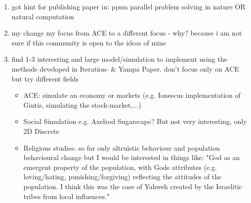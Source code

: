 \begin{enumerate}
\item got hint for publishing paper in: ppsm parallel problem solving in nature OR natural computation
	
\item my change my focus from ACE to a different focus - why? because i am not sure if this community is open to the ideas of mine
\item find 1-3 interesting and large model/simulation to implement using the methods developed in Iteration- \& Yampa Paper. don't focus only on ACE but try different fields
	\begin{itemize}
		\item ACE: simulate an economy or markets (e.g. Ionescus implementation of Gintis, simulating the stock-market,...)
		\item Social Simulation e.g. Axelrod Sugarscape? But not very interesting, only 2D Discrete 
		\item Religious studies: so far only altruistic behaviour and population behavioural change but I would be interested in things like: "God as an emergent property of the population, with Gods attributes (e.g. loving/hating, punishing/forgiving) reflecting the attitudes of the population. I think this was the case of Yahweh created by the Israelitic tribes from local influences."
	\end{itemize}

\end{enumerate} 


